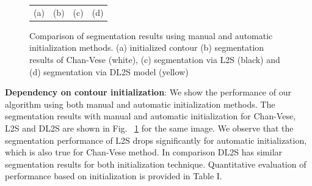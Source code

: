 \begin{figure}[b]
\begin{tabular}{@{}cccc@{}}
			\\
		    \scriptsize(a) & \scriptsize (b) &\scriptsize (c) & \scriptsize (d)
\end{tabular}
\caption[DL2S initialization robustness]{Comparison of segmentation results using manual and automatic initialization methods. (a) initialized contour (b) segmentation results of Chan-Vese (white), (c) segmentation via L2S (black) and (d) segmentation via DL2S model (yellow)}
\label{fig:init_compare}
\end{figure}

\textbf{Dependency on contour initialization}: We show the performance of our algorithm using both manual and automatic initialization methods. The segmentation results with manual and automatic initialization for Chan-Vese\cite{chan_vese}, L2S \cite{mukherjee_L2S} and DL2S are shown in Fig.~ \ref{fig:init_compare} for the same image. We observe that the segmentation performance of L2S drops significantly for automatic initialization, which is also true for Chan-Vese method. In comparison DL2S has similar segmentation results for both initialization technique. Quantitative evaluation of performance based on initialization is provided in Table I.
